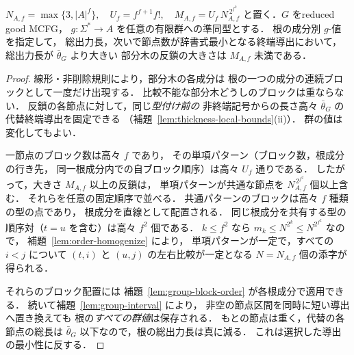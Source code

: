 \begin{lemma}[重い部分木の反鎖の一様な短縮]
\label{lem:group-heavy-antichain}
\(N_{A,f}=\max\{3,|A|^f\},\quad
 U_f=f^{f+1}f!,\quad
 M_{A,f}=U_f\,N_{A,f}^{\,2^{f^2}}\)
と置く．$G$ をreduced good MCFG，
$g:\Sigma^*\to A$ を任意の有限群への準同型とする．
根の成分別 $g$-値を指定して，
総出力長，次いで節点数が辞書式最小となる終端導出において，
総出力長が $\bar\theta_G$ より大きい
部分木の反鎖の大きさは $M_{A,f}$ 未満である．
\end{lemma}
\begin{proof}
線形・非削除規則により，部分木の各成分は
根の一つの成分の連続ブロックとして一度だけ出現する．
比較不能な部分木どうしのブロックは重ならない．
反鎖の各節点に対して，同じ\emph{型付け前の}
非終端記号からの長さ高々 $\bar\theta_G$ の
代替終端導出を固定できる
（補題~\ref{lem:thickness-local-bounds}(ii)）．
群の値は変化してもよい．

一節点のブロック数は高々 $f$ であり，
その単項パターン（ブロック数，根成分の行き先，
同一根成分内での自ブロック順序）は高々 $U_f$ 通りである．
したがって，大きさ $M_{A,f}$ 以上の反鎖は，
単項パターンが共通な節点を $N_{A,f}^{\,2^{f^2}}$ 個以上含む．
それらを任意の固定順序で並べる．
共通パターンのブロックは高々 $f$ 種類の型の点であり，
根成分を直線として配置される．
同じ根成分を共有する型の順序対（$t=u$ を含む）は高々 $f^2$ 個である．
$k\le f^2$ なら $m_k\le N^{2^k}\le N^{2^{f^2}}$ なので，
補題~\ref{lem:order-homogenize} により，
単項パターンが一定で，すべての $i<j$ について
$(t,i)$ と $(u,j)$ の左右比較が一定となる
$N=N_{A,f}$ 個の添字が得られる．

それらのブロック配置には
補題~\ref{lem:group-block-order} が各根成分で適用できる．
続いて補題~\ref{lem:group-interval} により，
非空の節点区間を同時に短い導出へ置き換えても
根の\emph{すべての群値}は保存される．
もとの節点は重く，代替の各節点の総長は
$\bar\theta_G$ 以下なので，根の総出力長は真に減る．
これは選択した導出の最小性に反する．
\end{proof}

